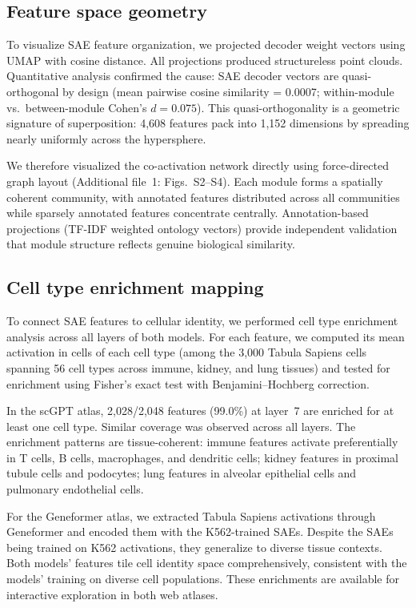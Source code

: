 \documentclass[onecolumn]{article}
\begin{document}
\subsection{Feature space geometry}
\label{sec:geometry}

To visualize SAE feature organization, we projected decoder weight vectors using UMAP with cosine distance. All projections produced structureless point clouds. Quantitative analysis confirmed the cause: SAE decoder vectors are quasi-orthogonal by design (mean pairwise cosine similarity = 0.0007; within-module vs.\ between-module Cohen's $d = 0.075$). This quasi-orthogonality is a geometric signature of superposition: 4,608 features pack into 1,152 dimensions by spreading nearly uniformly across the hypersphere.

We therefore visualized the co-activation network directly using force-directed graph layout (Additional file~1: Figs.~S2--S4). Each module forms a spatially coherent community, with annotated features distributed across all communities while sparsely annotated features concentrate centrally. Annotation-based projections (TF-IDF weighted ontology vectors) provide independent validation that module structure reflects genuine biological similarity.


\subsection{Cell type enrichment mapping}
\label{sec:celltypes}

To connect SAE features to cellular identity, we performed cell type enrichment analysis across all layers of both models. For each feature, we computed its mean activation in cells of each cell type (among the 3,000 Tabula Sapiens cells spanning 56 cell types across immune, kidney, and lung tissues) and tested for enrichment using Fisher's exact test with Benjamini--Hochberg correction.

In the scGPT atlas, 2,028/2,048 features (99.0\%) at layer~7 are enriched for at least one cell type. Similar coverage was observed across all layers. The enrichment patterns are tissue-coherent: immune features activate preferentially in T cells, B cells, macrophages, and dendritic cells; kidney features in proximal tubule cells and podocytes; lung features in alveolar epithelial cells and pulmonary endothelial cells.

For the Geneformer atlas, we extracted Tabula Sapiens activations through Geneformer and encoded them with the K562-trained SAEs. Despite the SAEs being trained on K562 activations, they generalize to diverse tissue contexts. Both models' features tile cell identity space comprehensively, consistent with the models' training on diverse cell populations. These enrichments are available for interactive exploration in both web atlases.
\end{document}

